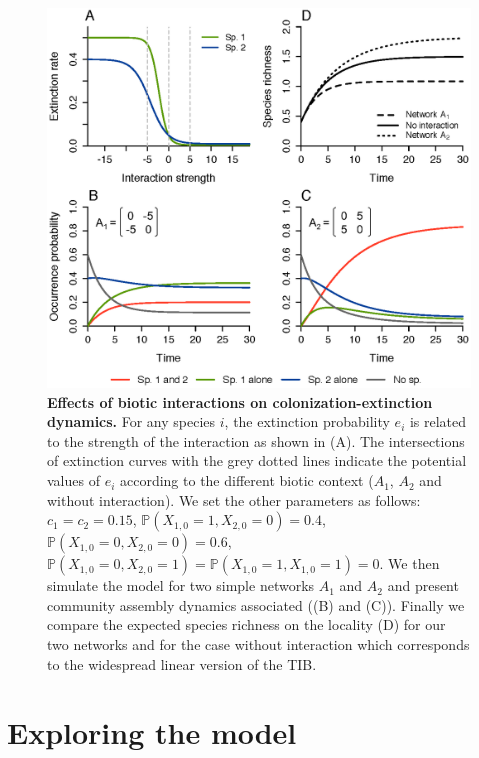 \begin{figure}[h!]
\centering
\includegraphics[width=\textwidth]{./chapitre1/fig2.eps}
\caption{\textbf{Effects of biotic interactions on colonization-extinction dynamics.} For any species $i$, the extinction probability $e_i$ is related to the strength of the interaction as shown in (A). The intersections of extinction curves with the grey dotted lines indicate the potential values of $e_i$ according to the different biotic context ($A_1$, $A_2$ and without interaction). We set the other parameters as follows: $c_1=c_2=0.15$, $\mathbb{P}(X_{1,0}=1 , X_{2,0}=0)=0.4$, $\mathbb{P}(X_{1,0}=0 , X_{2,0}=0)=0.6$, $\mathbb{P}(X_{1,0}=0 , X_{2,0}=1)=\mathbb{P}(X_{1,0}=1 , X_{1,0}=1)=0$. We then simulate the model for two simple networks $A_1$ and $A_2$ and present community assembly dynamics associated ((B) and (C)). Finally we compare the expected species richness on the locality (D) for our two networks and for the case without interaction which corresponds to the widespread linear version of the TIB.}
\label{chap1fig2}
\end{figure}

\section{Exploring the model}

